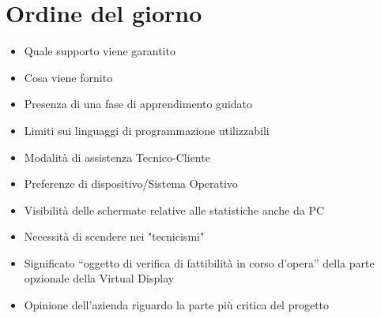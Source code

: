 \section{Ordine del giorno}
\begin{itemize}
    \item Quale supporto viene garantito
    \item Cosa viene fornito
    \item Presenza di una fase di apprendimento guidato
    \item Limiti sui linguaggi di programmazione utilizzabili
    \item Modalità di assistenza Tecnico-Cliente 
    \item Preferenze di dispositivo/Sistema Operativo
    \item Visibilità delle schermate relative alle
    statistiche anche da PC
    \item Necessità di scendere nei "tecnicismi"
    \item Significato “oggetto di
    verifica di fattibilità in corso
    d’opera” della parte opzionale
    della Virtual Display
    \item Opinione dell'azienda riguardo la parte più
    critica del progetto  
\end{itemize}
